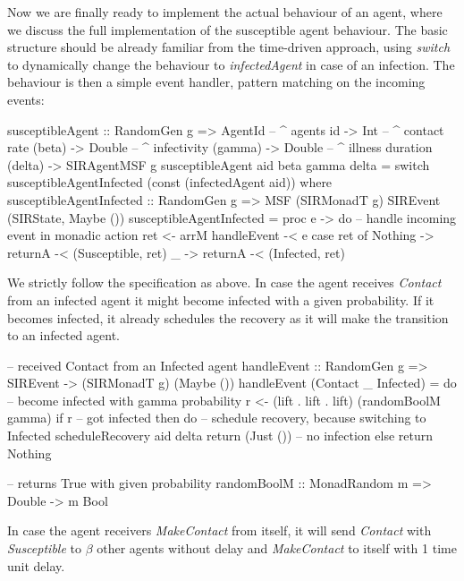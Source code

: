 Now we are finally ready to implement the actual behaviour of an agent, where we discuss the full implementation of the susceptible agent behaviour. The basic structure should be already familiar from the time-driven approach, using \textit{switch} to dynamically change the behaviour to \textit{infectedAgent} in case of an infection. The behaviour is then a simple event handler, pattern matching on the incoming events:

\begin{HaskellCode}
susceptibleAgent :: RandomGen g 
                 => AgentId        -- ^ agents id
                 -> Int            -- ^ contact rate (beta)
                 -> Double         -- ^ infectivity (gamma)
                 -> Double         -- ^ illness duration (delta)
                 -> SIRAgentMSF g
susceptibleAgent aid beta gamma delta = 
    switch susceptibleAgentInfected (const (infectedAgent aid))
  where
    susceptibleAgentInfected :: RandomGen g 
                             => MSF (SIRMonadT g) SIREvent (SIRState, Maybe ()) 
    susceptibleAgentInfected = proc e -> do
      -- handle incoming event in monadic action
      ret <- arrM handleEvent -< e
      case ret of
        Nothing -> returnA -< (Susceptible, ret)
        _       -> returnA -< (Infected, ret)
\end{HaskellCode}

We strictly follow the specification as above. In case the agent receives \textit{Contact} from an infected agent it might become infected with a given probability. If it becomes infected, it already schedules the recovery as it will make the transition to an infected agent.

\begin{HaskellCode}
-- received Contact from an Infected agent
handleEvent :: RandomGen g => SIREvent -> (SIRMonadT g) (Maybe ())
handleEvent (Contact _ Infected) = do
  -- become infected with gamma probability
  r <- (lift . lift . lift) (randomBoolM gamma)
  if r
    -- got infected 
    then do
      -- schedule recovery, because switching to Infected
      scheduleRecovery aid delta
      return (Just ())
    -- no infection
    else return Nothing

-- returns True with given probability
randomBoolM :: MonadRandom m => Double -> m Bool
\end{HaskellCode}

In case the agent receivers \textit{MakeContact} from itself, it will send \textit{Contact} with \textit{Susceptible} to $\beta$ other agents without delay and \textit{MakeContact} to itself with 1 time unit delay.

